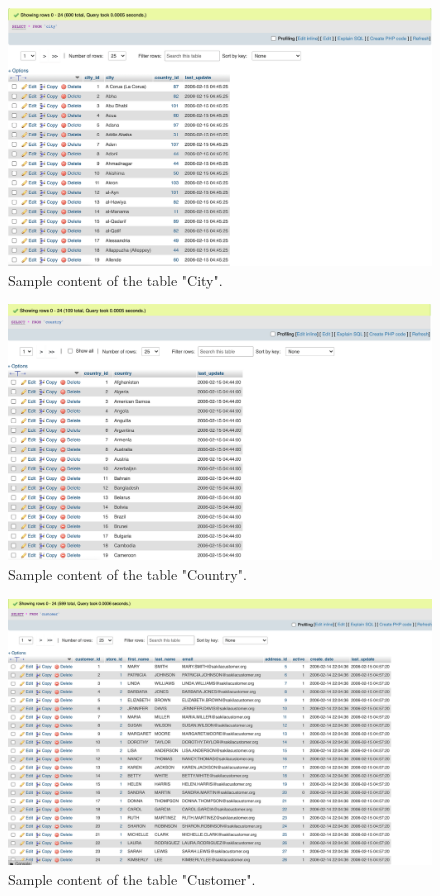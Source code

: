 \documentclass[openany]{article}
\begin{document}
		\begin{figure}[H]
			\includegraphics[width=\textwidth]{city_content}
			\caption{Sample content of the table "City".}
		\end{figure}
		\begin{figure}[H]
			\includegraphics[width=\textwidth]{country_content}
			\caption{Sample content of the table "Country".}
		\end{figure}
		\begin{figure}[H]
			\includegraphics[width=\textwidth]{customer_content}
			\caption{Sample content of the table "Customer".}
		\end{figure}
\end{document}

